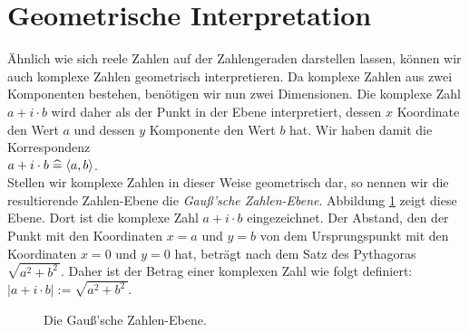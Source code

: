 \section{Geometrische Interpretation}
Ähnlich wie sich reele Zahlen auf der Zahlengeraden darstellen lassen, können wir auch komplexe Zahlen
geometrisch interpretieren.  Da komplexe Zahlen aus zwei Komponenten bestehen, benötigen wir nun zwei
Dimensionen.  Die komplexe Zahl $a + i \cdot b$ wird daher als der Punkt in der Ebene interpretiert,
dessen $x$ Koordinate den Wert $a$ und dessen $y$ Komponente den Wert $b$ hat.  Wir haben damit die
Korrespondenz 
\\[0.2cm]
\hspace*{1.3cm}
$a + i \cdot b \;\widehat{=}\; \pair(a,b)$.
\\[0.2cm]
Stellen wir komplexe Zahlen in dieser Weise geometrisch dar, so nennen wir die resultierende Zahlen-Ebene
die \emph{Gauß'sche Zahlen-Ebene}.  Abbildung \ref{fig:gauss-ebene.eps} zeigt diese Ebene.
Dort ist die komplexe Zahl $a + i \cdot b$ eingezeichnet.  Der Abstand, den der Punkt mit den Koordinaten
$x = a$ und $y = b$ von dem Ursprungspunkt mit den Koordinaten $x = 0$ und $y = 0$ hat, beträgt nach dem
Satz des Pythagoras $\sqrt{a^2 + b^2\,}$.  Daher ist der Betrag einer komplexen Zahl wie folgt definiert:
\\[0.2cm]
\hspace*{1.3cm}
$|a + i \cdot b| := \sqrt{a^2 + b^2\,}$.


\begin{figure}[!ht]
  \centering
  \caption{Die Gauß'sche Zahlen-Ebene.}
  \label{fig:gauss-ebene.eps}
\end{figure}

